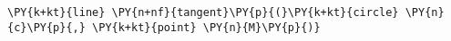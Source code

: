 \begin{Verbatim}[commandchars=\\\{\}]
    \PY{k+kt}{line} \PY{n+nf}{tangent}\PY{p}{(}\PY{k+kt}{circle} \PY{n}{c}\PY{p}{,} \PY{k+kt}{point} \PY{n}{M}\PY{p}{)}
\end{Verbatim}
